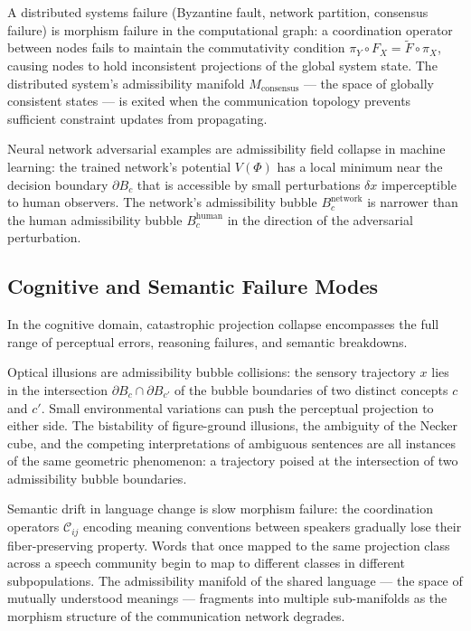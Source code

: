 \documentclass[12pt, a4paper]{article}
\theoremstyle{essaystyle}
\begin{document}
A distributed systems failure (Byzantine fault, network partition, consensus failure)
is morphism failure in the computational graph: a coordination operator between nodes
fails to maintain the commutativity condition $\pi_Y \circ F_X = \tilde{F} \circ \pi_X$,
causing nodes to hold inconsistent projections of the global system state. The
distributed system's admissibility manifold $M_{\mathrm{consensus}}$ --- the space of
globally consistent states --- is exited when the communication topology prevents
sufficient constraint updates from propagating.

Neural network adversarial examples are admissibility field collapse in machine
learning: the trained network's potential $V(\Phi)$ has a local minimum near the
decision boundary $\partial B_c$ that is accessible by small perturbations
$\delta x$ imperceptible to human observers. The network's admissibility bubble
$B_c^{\mathrm{network}}$ is narrower than the human admissibility bubble
$B_c^{\mathrm{human}}$ in the direction of the adversarial perturbation.

\subsection{Cognitive and Semantic Failure Modes}

In the cognitive domain, catastrophic projection collapse encompasses the full
range of perceptual errors, reasoning failures, and semantic breakdowns.

Optical illusions are admissibility bubble collisions: the sensory trajectory $x$
lies in the intersection $\partial B_c \cap \partial B_{c'}$ of the bubble boundaries
of two distinct concepts $c$ and $c'$. Small environmental variations can push the
perceptual projection to either side. The bistability of figure-ground illusions,
the ambiguity of the Necker cube, and the competing interpretations of ambiguous
sentences are all instances of the same geometric phenomenon: a trajectory poised
at the intersection of two admissibility bubble boundaries.

Semantic drift in language change is slow morphism failure: the coordination operators
$\mathcal{C}_{ij}$ encoding meaning conventions between speakers gradually lose
their fiber-preserving property. Words that once mapped to the same projection class
across a speech community begin to map to different classes in different subpopulations.
The admissibility manifold of the shared language --- the space of mutually understood
meanings --- fragments into multiple sub-manifolds as the morphism structure of the
communication network degrades.
\end{document}
